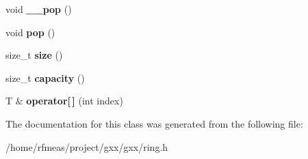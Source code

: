 \begin{DoxyCompactItemize}
\item 
void {\bfseries \+\_\+\+\_\+pop} ()\hypertarget{classgxx_1_1ring_a3bee30da39f2bd5e7fd974fc5816c4e5}{}\label{classgxx_1_1ring_a3bee30da39f2bd5e7fd974fc5816c4e5}

\item 
void {\bfseries pop} ()\hypertarget{classgxx_1_1ring_aa4f2ce49990915080cd9779e24611c60}{}\label{classgxx_1_1ring_aa4f2ce49990915080cd9779e24611c60}

\item 
size\+\_\+t {\bfseries size} ()\hypertarget{classgxx_1_1ring_a4955f162f4e1f52fca8e2a80ed68a4fc}{}\label{classgxx_1_1ring_a4955f162f4e1f52fca8e2a80ed68a4fc}

\item 
size\+\_\+t {\bfseries capacity} ()\hypertarget{classgxx_1_1ring_a47371995d0f292cd70ddd6dee1afd9cb}{}\label{classgxx_1_1ring_a47371995d0f292cd70ddd6dee1afd9cb}

\item 
T \& {\bfseries operator\mbox{[}$\,$\mbox{]}} (int index)\hypertarget{classgxx_1_1ring_a10f1ae2859647905679054c0400dd352}{}\label{classgxx_1_1ring_a10f1ae2859647905679054c0400dd352}

\end{DoxyCompactItemize}


The documentation for this class was generated from the following file\+:\begin{DoxyCompactItemize}
\item 
/home/rfmeas/project/gxx/gxx/ring.\+h\end{DoxyCompactItemize}
